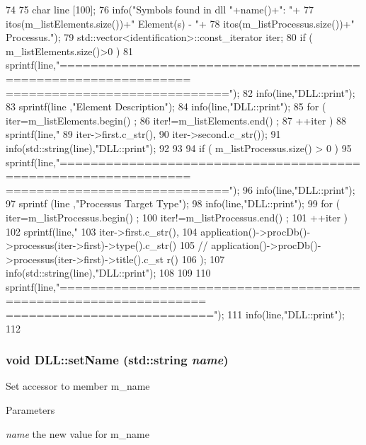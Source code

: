 \begin{DoxyCode}
74                   {
75   char line [100];
76   info("Symbols found in dll "+name()+": "+
77          itos(m_listElements.size())+" Element(s) - "+
78          itos(m_listProcessus.size())+" Processus.");
79   std::vector<identification>::const_iterator iter;
80   if ( m_listElements.size()>0 ) {
81     sprintf(line,"===============================================================
      =============================");
82     info(line,"DLL::print");
83     sprintf(line ,"Element                    Description");
84     info(line,"DLL::print");
85     for ( iter=m_listElements.begin() ;
86       iter!=m_listElements.end() ;
87       ++iter ) {
88       sprintf(line," %
89           iter->first.c_str(),
90           iter->second.c_str());
91       info(std::string(line),"DLL::print");
92     }
93   }
94   if ( m_listProcessus.size() > 0 ) {
95     sprintf(line,"===============================================================
      =============================");
96     info(line,"DLL::print");
97     sprintf (line ,"Processus                 Target Type");
98     info(line,"DLL::print");
99     for ( iter=m_listProcessus.begin() ;
100       iter!=m_listProcessus.end() ;
101       ++iter ) {
102       sprintf(line," %
103           iter->first.c_str(),
104           application()->procDb()->processus(iter->first)->type().c_str()
105           //        application()->procDb()->processus(iter->first)->title().c_st
      r()
106           );
107       info(std::string(line),"DLL::print");
108     }
109   }
110   sprintf(line,"=================================================================
      ===========================");
111   info(line,"DLL::print");
112 }
\end{DoxyCode}
\hypertarget{classDLL_afc65a270b32a08d0681819cf2317aef0}{
\subsubsection[{setName}]{\setlength{\rightskip}{0pt plus 5cm}void DLL::setName (std::string {\em name})}}
\label{classDLL_afc65a270b32a08d0681819cf2317aef0}
Set accessor to member m\_\-name 
\begin{DoxyParams}{Parameters}
\item[{\em name}]the new value for m\_\-name \end{DoxyParams}


